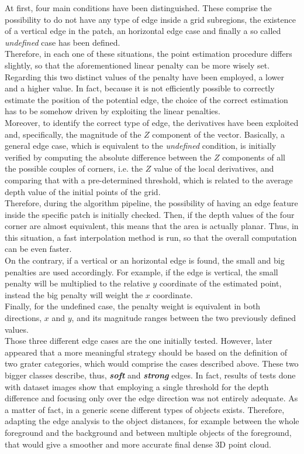 At first, four main conditions have been distinguished. 
These comprise the possibility to do not have any type of edge inside a grid subregions, the existence of a vertical edge in the patch, an horizontal edge case and finally a so called \textit{undefined} case has been defined.\\
Therefore, in each one of these situations, the point estimation procedure differs slightly, so that the aforementioned linear penalty can be more wisely set.
Regarding this two distinct values of the penalty have been employed, a lower and a higher value.
In fact, because it is not efficiently possible to correctly estimate the position of the potential edge, the choice of the correct estimation has to be somehow driven by exploiting the linear penalties. \\
Moreover, to identify the correct type of edge, the derivatives have been exploited and, specifically, the magnitude of the $Z$ component of the vector. 
Basically, a general edge case, which is equivalent to the \textit{undefined} condition, is initially verified by computing the absolute difference between the $Z$ components of all the possible couples of corners, i.e. the $Z$ value of the local derivatives, and comparing that with a pre-determined threshold, which is related to the average depth value of the initial points of the grid. \\
Therefore, during the algorithm pipeline, the possibility of having an edge feature inside the specific patch is initially checked.
Then, if the depth values of the four corner are almost equivalent, this means that the area is actually planar.
Thus, in this situation, a fast interpolation method is run, so that the overall computation can be even faster.\\
On the contrary, if a vertical or an horizontal edge is found, the small and big penalties are used accordingly.
For example, if the edge is vertical, the small penalty will be multiplied to the relative $y$ coordinate of the estimated point, instead the big penalty will weight the $x$ coordinate.\\
Finally, for the undefined case, the penalty weight is equivalent in both directions, $x$ and $y$, and its magnitude ranges between the two previously defined values. \\
Those three different edge cases are the one initially tested. 
However, later appeared that a more meaningful strategy should be based on the definition of two grater categories, which would comprise the cases described above.
These two bigger classes describe, thus, \textbf{\textit{soft}} and \textbf{\textit{strong}} edges. 
In fact, results of tests done with dataset images show that employing a single threshold for the depth difference and focusing only over the edge direction was not entirely adequate. 
As a matter of fact, in a generic scene different types of objects exists. 
Therefore, adapting the edge analysis to the object distances, for example between the whole foreground and the background and between multiple objects of the foreground, that would give a smoother and more accurate final dense 3D point cloud.

